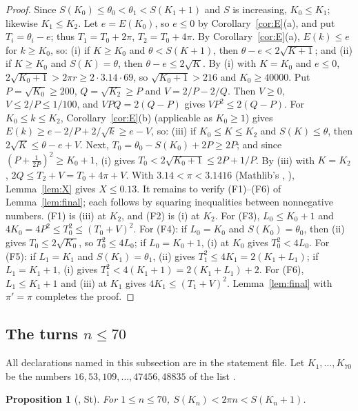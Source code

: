 \documentclass[11pt]{amsart}
\theoremstyle{plain}
\newtheorem{proposition}[theorem]{Proposition}
\theoremstyle{definition}
\begin{document}
\begin{proof}
Since $S(K_0)\le\theta_0<\theta_1<S(K_1+1)$ and $S$ is increasing, $K_0\le K_1$; likewise $K_1\le K_2$.
Let $e=E(K_0)$, so $e\le0$ by Corollary~\ref{cor:E}(a), and put $T_i=\theta_i-e$; thus $T_1=T_0+2\pi$, $T_2=T_0+4\pi$.
By Corollary~\ref{cor:E}(a), $E(k)\le e$ for $k\ge K_0$, so:
(i) if $K\ge K_0$ and $\theta<S(K+1)$, then $\theta-e<2\sqrt{K+1}$; and (ii) if $K\ge K_0$ and $S(K)=\theta$, then $\theta-e\le2\sqrt K$.
By (i) with $K=K_0$ and $e\le0$, $2\sqrt{K_0+1}>2\pi r\ge2\cdot3.14\cdot69$, so $\sqrt{K_0+1}>216$ and $K_0\ge40000$.
Put $P=\sqrt{K_0}\ge200$, $Q=\sqrt{K_2}\ge P$ and $V=2/P-2/Q$. Then $V\ge0$, $V\le2/P\le1/100$, and $VPQ=2(Q-P)$ gives $VP^2\le2(Q-P)$.
For $K_0\le k\le K_2$, Corollary~\ref{cor:E}(b) (applicable as $K_0\ge1$) gives $E(k)\ge e-2/P+2/\sqrt k\ge e-V$, so:
(iii) if $K_0\le K\le K_2$ and $S(K)\le\theta$, then $2\sqrt K\le\theta-e+V$.
Next, $T_0=\theta_0-S(K_0)+2P\ge2P$; and since $(P+\frac1{2P})^2\ge K_0+1$, (i) gives $T_0<2\sqrt{K_0+1}\le2P+1/P$. By (iii) with $K=K_2$, $2Q\le T_2+V=T_0+4\pi+V$.
With $3.14<\pi<3.1416$ (Mathlib's , ), Lemma~\ref{lem:X} gives $X\le0.13$.
It remains to verify (F1)--(F6) of Lemma~\ref{lem:final}; each follows by squaring inequalities between nonnegative numbers.
(F1) is (iii) at $K_2$, and (F2) is (i) at $K_2$.
For (F3), $L_0\le K_0+1$ and $4K_0=4P^2\le T_0^2\le(T_0+V)^2$.
For (F4): if $L_0=K_0$ and $S(K_0)=\theta_0$, then (ii) gives $T_0\le2\sqrt{K_0}$, so $T_0^2\le4L_0$; if $L_0=K_0+1$, (i) at $K_0$ gives $T_0^2<4L_0$.
For (F5): if $L_1=K_1$ and $S(K_1)=\theta_1$, (ii) gives $T_1^2\le4K_1=2(K_1+L_1)$; if $L_1=K_1+1$, (i) gives $T_1^2<4(K_1+1)=2(K_1+L_1)+2$.
For (F6), $L_1\le K_1+1$ and (iii) at $K_1$ gives $4K_1\le(T_1+V)^2$.
Lemma~\ref{lem:final} with $\pi'=\pi$ completes the proof.
\end{proof}

\subsection{The turns \texorpdfstring{$n\le70$}{n <= 70}}\label{sec:small}
All declarations named in this subsection are in the statement file.
Let $K_1,\dots,K_{70}$ be the numbers $16,53,109,\dots,47456,48835$ of the list .

\begin{proposition}[, St]\label{prop:crossing}
For $1\le n\le70$, $S(K_n)<2\pi n<S(K_n+1)$.
\end{proposition}
\end{document}
